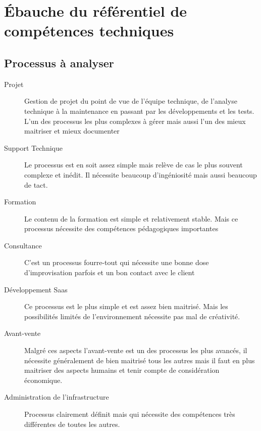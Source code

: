 \chapter{Ébauche du référentiel de compétences techniques}

\section{Processus à analyser}
\begin{description}
  \item[Projet]
  Gestion de projet du point de vue de l’équipe technique, de l'analyse technique à la maintenance en passant par les développements et les tests. L'un des processus les plus complexes à gérer mais aussi l'un des mieux maitriser et mieux documenter
  \item[Support Technique]
  Le processus est en soit assez simple mais relève de cas le plus souvent complexe et inédit. Il nécessite beaucoup d'ingéniosité mais aussi beaucoup de tact.
  \item[Formation]
  Le contenu de la formation est simple et relativement stable. Mais ce processus nécessite des compétences pédagogiques importantes
  \item[Consultance]
  C'est un processus fourre-tout qui nécessite une bonne dose d'improvisation parfois et un bon contact avec le client
  \item[Développement Saas] 
  Ce processus est le plus simple et est assez bien maitrisé. Mais les possibilités limités de l'environnement nécessite pas mal de créativité.
  \item[Avant-vente]
  Malgré ces aspects l'avant-vente est un des processus les plus avancés, il nécessite généralement de bien maitrisé tous les autres mais il faut en plus maitriser des aspects humains et tenir compte de considération économique.
  \item[Administration de l'infrastructure]
  Processus clairement définit mais qui nécessite des compétences très différentes de toutes les autres. 
\end{description}


